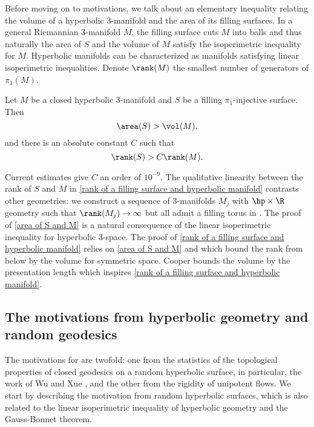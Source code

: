 Before moving on to motivations, we talk about an elementary inequality relating the volume of a hyperbolic $3$-manifold and the area of its filling surfaces. In a general Riemannian $3$-manifold $M$, the filling surface cuts $M$ into balls and thus naturally the area of $S$ and the volume of $M$ satisfy the isoperimetric inequality for $M$. Hyperbolic manifolds can be characterized as manifolds satisfying linear isoperimetric inequalities. Denote $\rank(M)$ the smallest number of generators of $\pi_1(M)$. 
 \begin{theorem}\label{isoperimetric inequality filling surface has area at least volume}
	Let $M$ be a closed hyperbolic $3$-manifold and $S$ be a filling $\pi_1$-injective surface. Then 
	\begin{equation}\label{area of S and M}
		\area(S) > \vol(M),
	\end{equation}
	and there is an absolute constant $C$ such that 
	\begin{equation}\label{rank of a filling surface and hyperbolic manifold}
		\rank(S)>C\rank(M).
	\end{equation}
\end{theorem}
Current estimates give $C$ an order of $10^{-9}$. The qualitative linearity between the rank of $S$ and $M$ in \eqref{rank of a filling surface and hyperbolic manifold} contrasts other geometries: we construct a sequence of $3$-manifolds $M_j$ with $\hp\times \R$ geometry such that $\rank(M_j) \rightarrow \infty$ but all admit a filling torus in . The proof of \eqref{area of S and M} is a natural consequence of the linear isoperimetric inequality for hyperbolic $3$-space. The proof of \eqref{rank of a filling surface and hyperbolic manifold} relies on \eqref{area of S and M} and \cite{bglsCountingArithmeticLattices} which bound the rank from below by the volume for symmetric space. Cooper \cite{cdPresentationLengthVolume} bounds the volume by the presentation length which inspires \eqref{rank of a filling surface and hyperbolic manifold}. 

\subsection{The motivations from hyperbolic geometry and random geodesics}
The motivations for  are twofold: one from the statistics of the topological properties of closed geodesics on a random hyperbolic surface, in particular, the work of Wu and Xue \cite{wxPrimeGeodesicTheorem}, and the other from the rigidity of unipotent flows. We start by describing the motivation from random hyperbolic surfaces, which is also related to the linear isoperimetric inequality of hyperbolic geometry and the Gauss-Bonnet theorem. 

